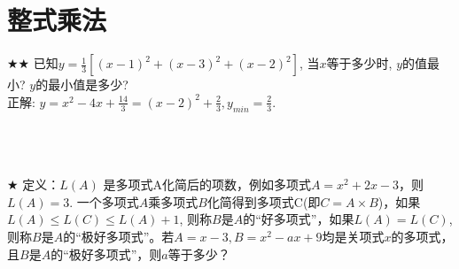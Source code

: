 \section{整式乘法}

\item {
    $\bigstar \bigstar$
    已知$y=\frac13 [(x - 1)^2 + (x - 3)^2 + (x - 2)^2]$, 当$x$等于多少时, $y$的值最小? $y$的最小值是多少? 
    \ifshowSolution
        \fangsong{}
        \\
        正解: $y=x^2 - 4x + \frac{14}{3} = (x-2)^2+\frac23, y_{min}=\frac23$.
    \else
        \\ \\ \\ \\ 
    \fi
}

\item {
    $\bigstar$
    定义：$L(A)$ 是多项式A化简后的项数，例如多项式$A=x^2+2x-3$，则$L(A)=3$. 一个多项式$A$乘多项式$B$化简得到多项式C(即$C=A\times B$)，如果$L(A)\leq L(C)\leq L(A)+1$, 则称$B$是$A$的``好多项式''，如果$L(A)=L(C)$, 则称$B$是$A$的``极好多项式''。若$A=x-3, B=x^2-ax+9$均是关项式$x$的多项式，且$B$是$A$的“极好多项式”，则$a$等于多少？
    \ifshowSolution
        \fangsong{}
        \\
    \else
        \\ \\ \\ \\ 
    \fi
}


